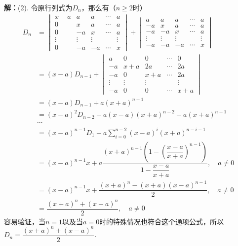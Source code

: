 {\bf 解：}(2). 令原行列式为$D_n$，那么有（$n\geqslant 2$时）
\begin{align*}
D_n & = \begin{vmatrix} x-a & a & a & \cdots & a \\ 0 & x & a & \cdots & a \\ 0 & -a & x & \cdots & a \\ \vdots & \vdots & \vdots & & \vdots \\ 0 & -a & -a & \cdots & x \end{vmatrix} + \begin{vmatrix} a & a & a & \cdots & a \\ -a & x & a & \cdots & a \\ -a & -a & x & \cdots & a \\ \vdots & \vdots & \vdots & & \vdots \\ -a & -a & -a & \cdots & x \end{vmatrix} \\
& = (x-a)D_{n-1} + \begin{vmatrix} a & 0 & 0 & \cdots & 0 \\ -a & x+a & 2a & \cdots & 2a \\ -a & 0 & x+a & \cdots & 2a \\ \vdots & \vdots & \vdots & & \vdots \\ -a & 0 & 0 & \cdots & x+a \end{vmatrix} \\
& = (x-a)D_{n-1} + a (x+a)^{n-1} \\
& = (x-a)^2D_{n-2} + a(x-a)(x+a)^{n-2} + a(x+a)^{n-1} \\
& \cdots \\
& = (x-a)^{n-1} D_1 + a\sum\limits_{i=0}^{n-2} (x-a)^i(x+a)^{n-i-1} \\
& = (x-a)^{n-1} x + a\dfrac{(x+a)^{n-1}\left(1 - \left(\dfrac{x-a}{x+a}\right)^{n-1} \right)}{1 - \dfrac{x-a}{x+a}}, \quad a \neq 0 \\
& = (x-a)^{n-1} x + \dfrac{(x+a)^n-(x+a)(x-a)^{n-1}}{2}, \quad a \neq 0 \\
& = \dfrac{(x+a)^n+(x-a)^n}{2}, \quad a \neq 0
\end{align*}
容易验证，当$n = 1$以及当$a = 0$时的特殊情况也符合这个通项公式，所以$D_n = \dfrac{(x+a)^n+(x-a)^n}{2}$.

